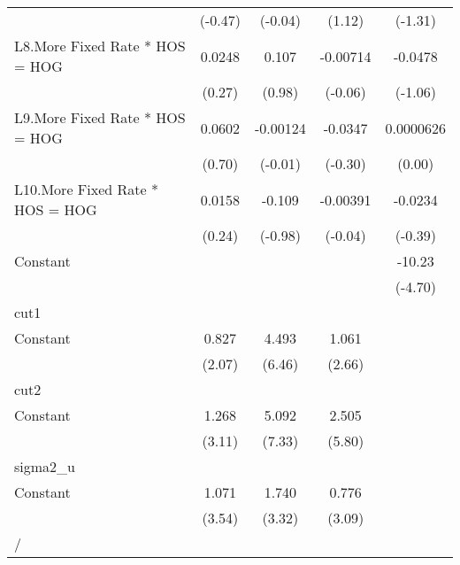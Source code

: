 {\begin{longtable}{l*{4}{c}}
                &  (-0.47)         &  (-0.04)         &   (1.12)         &  (-1.31)         \\
[1em]
L8.More Fixed Rate * HOS = HOG&   0.0248         &    0.107         & -0.00714         &  -0.0478         \\
                &   (0.27)         &   (0.98)         &  (-0.06)         &  (-1.06)         \\
[1em]
L9.More Fixed Rate * HOS = HOG&   0.0602         & -0.00124         &  -0.0347         &0.0000626         \\
                &   (0.70)         &  (-0.01)         &  (-0.30)         &   (0.00)         \\
[1em]
L10.More Fixed Rate * HOS = HOG&   0.0158         &   -0.109         & -0.00391         &  -0.0234         \\
                &   (0.24)         &  (-0.98)         &  (-0.04)         &  (-0.39)         \\
[1em]
Constant        &                  &                  &                  &   -10.23\sym{***}\\
                &                  &                  &                  &  (-4.70)         \\
\hline
cut1            &                  &                  &                  &                  \\
Constant        &    0.827\sym{*}  &    4.493\sym{***}&    1.061\sym{**} &                  \\
                &   (2.07)         &   (6.46)         &   (2.66)         &                  \\
\hline
cut2            &                  &                  &                  &                  \\
Constant        &    1.268\sym{**} &    5.092\sym{***}&    2.505\sym{***}&                  \\
                &   (3.11)         &   (7.33)         &   (5.80)         &                  \\
\hline
sigma2\_u        &                  &                  &                  &                  \\
Constant        &    1.071\sym{***}&    1.740\sym{***}&    0.776\sym{**} &                  \\
                &   (3.54)         &   (3.32)         &   (3.09)         &                  \\
\hline
/               &                  &                  &                  &                  \\

\end{longtable}}
